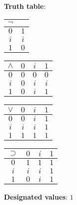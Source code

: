 \documentclass[a4paper]{article}
\begin{document}
\textbf{Truth table}:
\begin{center}
	\renewcommand{\arraystretch}{1.2}
	\begin{tabular}{|c|c|}
		\hline
		$\lnot$ & \\\hline
		$0$ & $1$ \\
		$i$ & $i$ \\
		$1$ & $0$ \\\hline
	\end{tabular}
	\quad
	\begin{tabular}{|c|ccc|}
		\hline
		$\land$ & $0$ & $i$ & $1$ \\\hline
		$0$ & $0$ & $0$ & $0$ \\
		$i$ & $0$ & $i$ & $i$ \\
		$1$ & $0$ & $i$ & $1$ \\\hline
	\end{tabular}
	\quad
	\begin{tabular}{|c|ccc|}
		\hline
		$\lor$ & $0$ & $i$ & $1$ \\\hline
		$0$ & $0$ & $i$ & $1$ \\
		$i$ & $i$ & $i$ & $1$ \\
		$1$ & $1$ & $1$ & $1$ \\\hline
	\end{tabular}
	\quad
	\begin{tabular}{|c|ccc|}
		\hline
		$\supset$ & $0$ & $i$ & $1$ \\\hline
		$0$ & $1$ & $1$ & $1$ \\
		$i$ & $i$ & $i$ & $1$ \\
		$1$ & $0$ & $i$ & $1$ \\\hline
	\end{tabular}
\end{center}

\textbf{Designated values}: $1$

\pagebreak
\end{document}
